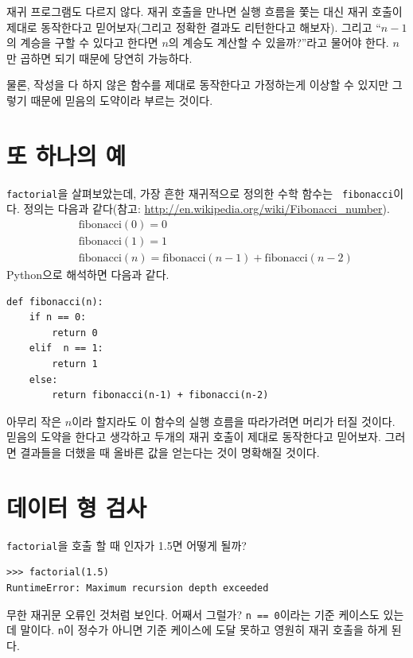 \documentclass[10pt]{book}
\begin{document}
재귀 프로그램도 다르지 않다.  재귀 호출을 만나면 실행 흐름을 쫓는 대신
재귀 호출이 제대로 동작한다고 믿어보자(그리고 정확한 결과도 리턴한다고
해보자).  그리고 ``$n-1$의 계승을 구할 수 있다고 한다면 $n$의 계승도
계산할 수 있을까?''라고 물어야 한다.  $n$만 곱하면 되기 때문에 당연히
가능하다.

물론, 작성을 다 하지 않은 함수를 제대로 동작한다고 가정하는게 이상할 수
있지만 그렇기 때문에 믿음의 도약이라 부르는 것이다.



\section{또 하나의 예}
\label{one.more.example}

  {\tt factorial}을
살펴보았는데, 가장 흔한 재귀적으로 정의한 수학 함수는 {\tt
  fibonacci}이다.  정의는 다음과 같다(참고:
\url{http://en.wikipedia.org/wiki/Fibonacci_number}).
%
\begin{eqnarray*}
&& \mathrm{fibonacci}(0) = 0 \\
&& \mathrm{fibonacci}(1) = 1 \\
&& \mathrm{fibonacci}(n) = \mathrm{fibonacci}(n-1) + \mathrm{fibonacci}(n-2)
\end{eqnarray*}
%
Python으로 해석하면 다음과 같다. 

\begin{verbatim}
def fibonacci(n):
    if n == 0:
        return 0
    elif  n == 1:
        return 1
    else:
        return fibonacci(n-1) + fibonacci(n-2)
\end{verbatim}
%
아무리 작은 $n$이라 할지라도 이 함수의 실행 흐름을 따라가려면 머리가
터질 것이다.  믿음의 도약을 한다고 생각하고 두개의 재귀 호출이 제대로
동작한다고 믿어보자.  그러면 결과들을 더했을 때 올바른 값을 얻는다는
것이 명확해질 것이다.


\section{데이터 형 검사}
\label{guardian}

{\tt factorial}을 호출 할 때 인자가 1.5면 어떻게 될까?

\begin{verbatim}
>>> factorial(1.5)
RuntimeError: Maximum recursion depth exceeded
\end{verbatim}
%
무한 재귀문 오류인 것처럼 보인다.  어째서 그럴가?  {\tt n == 0}이라는
기준 케이스도 있는데 말이다.  {\tt n}이 정수가 아니면 기준 케이스에
도달 못하고 영원히 재귀 호출을 하게 된다.
\end{document}
